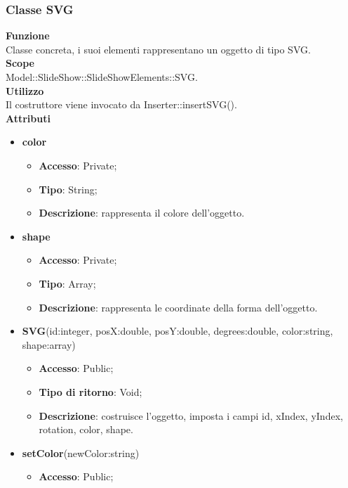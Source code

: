 {	\subsubsection{Classe SVG}{
		\label{SVG}
		\textbf{Funzione}\\
			\indent Classe concreta, i suoi elementi rappresentano un oggetto di tipo SVG.\\
	   	\textbf{Scope}\\
			\indent Model::SlideShow::SlideShowElements::SVG.\\
		\textbf{Utilizzo}\\
			\indent Il costruttore viene invocato da Inserter::insertSVG().\\
		\textbf{Attributi}
		\begin{itemize}
			\item \textbf{color}
			\begin{itemize}
				\item \textbf{Accesso}: Private;
				\item \textbf{Tipo}: String;
				\item \textbf{Descrizione}: rappresenta il colore dell’oggetto.
			\end{itemize}
			\item \textbf{shape}
			\begin{itemize}
				\item \textbf{Accesso}: Private;
				\item \textbf{Tipo}: Array;
				\item \textbf{Descrizione}: rappresenta le coordinate della forma dell’oggetto.
			\end{itemize}
		\end{itemize}
		\begin{itemize}
			\item \textbf{SVG}(id:integer, posX:double, posY:double, degrees:double, color:string, shape:array)
			\begin{itemize}
				\item \textbf{Accesso}: Public;
				\item \textbf{Tipo di ritorno}: Void;
				\item \textbf{Descrizione}: costruisce l’oggetto, imposta i campi id, xIndex, yIndex, rotation, color, shape.
			\end{itemize}
			\item \textbf{setColor}(newColor:string)
			\begin{itemize}
				\item \textbf{Accesso}: Public;

\end{itemize}
\end{itemize}}}
